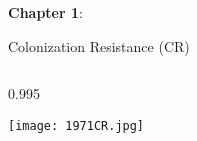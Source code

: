 

\begin{frame}[plain]
    \centering \hspace*{-1cm} \vspace*{-4cm}
        \begin{minipage}{0.8\textwidth}
            \centering
                {\LARGE
                    \textbf{Chapter 1}: \Large\textit{\chapterone}}
        \end{minipage}
        \vfill
\end{frame}



\begin{frame}{Colonization Resistance (CR)}
    \vspace*{-10mm} %
    \begin{minipage}[t][\usableheight][t]{\usablewidth}
        \begin{columns}[T]  
            \begin{column}{0.995\usablewidth} 
                \begin{block}{\tiny\cite{van_der_waaij_colonization_1971}}
                \centering \vspace*{2mm} %
                    \texttt{[image: 1971CR.jpg]}
                \end{block}
            \end{column}
        \end{columns}
    \end{minipage}
\end{frame}